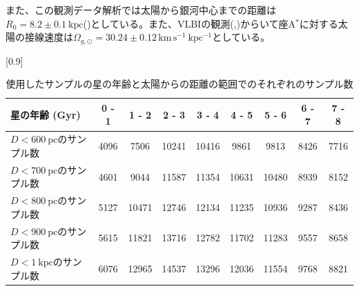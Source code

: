 また、この観測データ解析では太陽から銀河中心までの距離は$R_0 = 8.2\pm 0.1\ \mathrm{kpc}$(\cite{BH2016})としている。また、VLBIの観測(\cite{RB04},\cite{Reid08})からいて座A$^*$に対する太陽の接線速度は$\Omega_{g,\odot} = 30.24 \pm 0.12\,\mathrm{km\,s^{-1}\ kpc^{-1}}$としている。



\begin{table}[htb]
\small
\begin{center}
\scalebox{0.87}[0.9]{
\begin{tabular}{|l|cccccccc|} \hline
    星の年齢 (Gyr) & 0 - 1 & 1 - 2 & 2 - 3 & 3 - 4 & 4 - 5 & 5 - 6 & 6 - 7 & 7 - 8\\ \hline
    $D<600\ \mathrm{pc}$のサンプル数& 4096 & 7506 & 10241 & 10416 & 9861 & 9813 & 8426 & 7716\\
    $D<700\ \mathrm{pc}$のサンプル数 & 4601 & 9044 & 11587 & 11354 & 10631 & 10480 & 8939 & 8152\\
    $D<800\ \mathrm{pc}$のサンプル数 & 5127 & 10471 & 12746 & 12134 & 11235 & 10936 & 9287 & 8436\\
    $D<900\ \mathrm{pc}$のサンプル数 & 5615 & 11821 & 13716 & 12782 & 11702 & 11283 & 9557 & 8658\\
    $D<1\ \mathrm{kpc}$のサンプル数  & 6076 & 12965 & 14537 & 13296 & 12036 & 11554 & 9768 & 8821\\ \hline
\end{tabular}
}
\caption{使用したサンプルの星の年齢と太陽からの距離の範囲でのそれぞれのサンプル数}
\end{center} \label{dataset}
\end{table}


